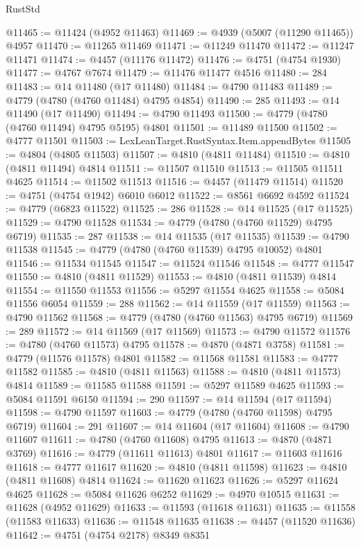 \begin{lexlean}{RustStd}
\begin{coremodule}
@11465 := @11424 (@4952 @11463)
@11469 := @4939 (@5007 (@11290 @11465)) @4957
@11470 := @11265 @11469
@11471 := @11249 @11470
@11472 := @11247 @11471
@11474 := @4457 (@11176 @11472)
@11476 := @4751 (@4754 @1930)
@11477 := @4767 @7674
@11479 := @11476 @11477 @4516
@11480 := 284
@11483 := @14 @11480 (@17 @11480)
@11484 := @4790 @11483
@11489 := @4779 (@4780 (@4760 @11484) @4795 @4854)
@11490 := 285
@11493 := @14 @11490 (@17 @11490)
@11494 := @4790 @11493
@11500 := @4779 (@4780 (@4760 @11494) @4795 @5195) @4801
@11501 := @11489 @11500
@11502 := @4777 @11501
@11503 := LexLeanTarget.RustSyntax.Item.appendBytes
@11505 := @4804 (@4805 @11503)
@11507 := @4810 (@4811 @11484)
@11510 := @4810 (@4811 @11494) @4814
@11511 := @11507 @11510
@11513 := @11505 @11511 @4625
@11514 := @11502 @11513
@11516 := @4457 (@11479 @11514)
@11520 := @4751 (@4754 @1942) @6010 @6012
@11522 := @8561 @6692 @4592
@11524 := @4779 (@6823 @11522)
@11525 := 286
@11528 := @14 @11525 (@17 @11525)
@11529 := @4790 @11528
@11534 := @4779 (@4780 (@4760 @11529) @4795 @6719)
@11535 := 287
@11538 := @14 @11535 (@17 @11535)
@11539 := @4790 @11538
@11545 := @4779 (@4780 (@4760 @11539) @4795 @10052) @4801
@11546 := @11534 @11545
@11547 := @11524 @11546
@11548 := @4777 @11547
@11550 := @4810 (@4811 @11529)
@11553 := @4810 (@4811 @11539) @4814
@11554 := @11550 @11553
@11556 := @5297 @11554 @4625
@11558 := @5084 @11556 @6054
@11559 := 288
@11562 := @14 @11559 (@17 @11559)
@11563 := @4790 @11562
@11568 := @4779 (@4780 (@4760 @11563) @4795 @6719)
@11569 := 289
@11572 := @14 @11569 (@17 @11569)
@11573 := @4790 @11572
@11576 := @4780 (@4760 @11573) @4795
@11578 := @4870 (@4871 @3758)
@11581 := @4779 (@11576 @11578) @4801
@11582 := @11568 @11581
@11583 := @4777 @11582
@11585 := @4810 (@4811 @11563)
@11588 := @4810 (@4811 @11573) @4814
@11589 := @11585 @11588
@11591 := @5297 @11589 @4625
@11593 := @5084 @11591 @6150
@11594 := 290
@11597 := @14 @11594 (@17 @11594)
@11598 := @4790 @11597
@11603 := @4779 (@4780 (@4760 @11598) @4795 @6719)
@11604 := 291
@11607 := @14 @11604 (@17 @11604)
@11608 := @4790 @11607
@11611 := @4780 (@4760 @11608) @4795
@11613 := @4870 (@4871 @3769)
@11616 := @4779 (@11611 @11613) @4801
@11617 := @11603 @11616
@11618 := @4777 @11617
@11620 := @4810 (@4811 @11598)
@11623 := @4810 (@4811 @11608) @4814
@11624 := @11620 @11623
@11626 := @5297 @11624 @4625
@11628 := @5084 @11626 @6252
@11629 := @4970 @10515
@11631 := @11628 (@4952 @11629)
@11633 := @11593 (@11618 @11631)
@11635 := @11558 (@11583 @11633)
@11636 := @11548 @11635
@11638 := @4457 (@11520 @11636)
@11642 := @4751 (@4754 @2178) @8349 @8351

\end{coremodule}
\end{lexlean}
